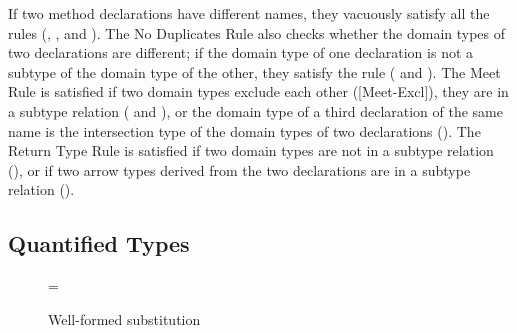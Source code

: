 If two method declarations have different names, they vacuously
satisfy all the rules ({}, {}, and
{}).  The No Duplicates Rule also checks whether the
domain types of two declarations are different; if the domain type of one
declaration is not a subtype of the domain type of the other, they
satisfy the rule ({} and {}).
The Meet Rule is satisfied if two domain types exclude
each other ([{\sc Meet-Excl}]), they are in a subtype relation
({} and {}), or the domain type of a third
declaration of the same name is the intersection type of the domain types
of two declarations ({}).  The Return Type Rule is
satisfied if two domain types are not in a subtype relation
({}), or if two arrow types derived from the two declarations are
in a subtype relation ({}).

\subsection{Quantified Types}\label{sec:quant}
\begin{figure}[t]
\small
{}

\infrule
  { \sigma=
    \andalso
    \rep{\jsubtype[\same{\Delta}]{\same{\sigma}\chi}{\alpha}}
    \andalso
    \rep{\jsubtype[\same{\Delta}]{\alpha}{\same{\sigma}\eta}}
  }
  {  }
\vspace*{-1em}
\caption{Well-formed substitution}
\label{fig:wellformedsubst}
\end{figure}

